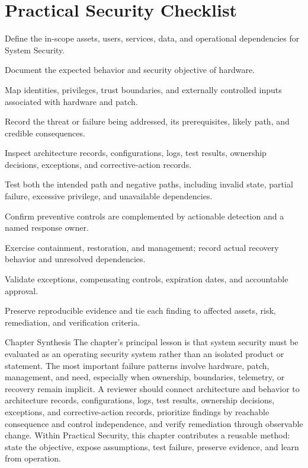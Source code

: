 \documentclass[11pt,letterpaper]{article}
\begin{document}
\section*{Practical Security Checklist}
\begin{CornellChecklist}
\item Define the in-scope assets, users, services, data, and operational dependencies for System Security.
\item Document the expected behavior and security objective of hardware.
\item Map identities, privileges, trust boundaries, and externally controlled inputs associated with hardware and patch.
\item Record the threat or failure being addressed, its prerequisites, likely path, and credible consequences.
\item Inspect architecture records, configurations, logs, test results, ownership decisions, exceptions, and corrective-action records.
\item Test both the intended path and negative paths, including invalid state, partial failure, excessive privilege, and unavailable dependencies.
\item Confirm preventive controls are complemented by actionable detection and a named response owner.
\item Exercise containment, restoration, and management; record actual recovery behavior and unresolved dependencies.
\item Validate exceptions, compensating controls, expiration dates, and accountable approval.
\item Preserve reproducible evidence and tie each finding to affected assets, risk, remediation, and verification criteria.
\end{CornellChecklist}
\begin{CornellSummaryBox}{Chapter Synthesis}
The chapter's principal lesson is that system security must be evaluated as an operating security system rather than an isolated product or statement. The most important failure patterns involve hardware, patch, management, and need, especially when ownership, boundaries, telemetry, or recovery remain implicit. A reviewer should connect architecture and behavior to architecture records, configurations, logs, test results, ownership decisions, exceptions, and corrective-action records, prioritize findings by reachable consequence and control independence, and verify remediation through observable change. Within Practical Security, this chapter contributes a reusable method: state the objective, expose assumptions, test failure, preserve evidence, and learn from operation.
\end{CornellSummaryBox}
\end{document}
